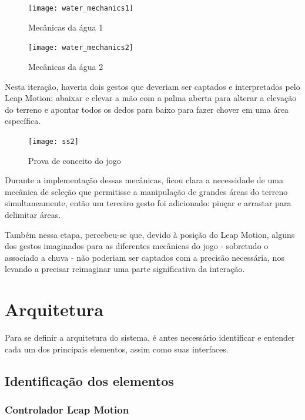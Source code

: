 \begin{figure}[ht]
	\centering
	\texttt{[image: water\_mechanics1]}
	\caption{Mecânicas da água 1}
\end{figure}

\begin{figure}[ht]
	\centering
	\texttt{[image: water\_mechanics2]}
	\caption{Mecânicas da água 2}
\end{figure}

Nesta iteração, haveria dois gestos que deveriam ser captados e interpretados pelo Leap Motion: abaixar e elevar a mão com a palma aberta para alterar a elevação do terreno e apontar todos os dedos para baixo para fazer chover em uma área específica.

\begin{figure}[ht]
	\centering
	\texttt{[image: ss2]}
	\caption{Prova de conceito do jogo}
\end{figure}

Durante a implementação dessas mecânicas, ficou clara a necessidade de uma mecânica de seleção que permitisse a manipulação de grandes áreas do terreno simultaneamente, então um terceiro gesto foi adicionado: pinçar e arrastar para delimitar áreas.

Também nessa etapa, percebeu-se que, devido à posição do Leap Motion, alguns dos gestos imaginados para as diferentes mecânicas do jogo - sobretudo o associado a chuva - não poderiam ser captados com a precisão necessária, nos levando a precisar reimaginar uma parte significativa da interação.


\section{Arquitetura}\label{sec-desenvolvimento-arquitetura}

Para se definir a arquitetura do sistema, é antes necessário identificar e entender cada um dos principais elementos, assim como suas interfaces.

\subsection{Identificação dos elementos}\label{subsec-identificacao-elementos}

\subsubsection{Controlador Leap Motion}\label{subsubsec-elemento-leapmotion}

